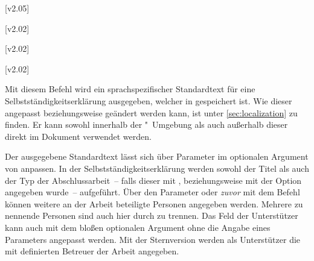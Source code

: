 \begin{DeclareEntity*}{}
\begin{DeclareEntity*}{}
\begin{DeclareEntity*}{}
\begin{Declaration}
  {}
\begin{Declaration}
  {}
  [v2.05]
\begin{Declaration}
  {}
\begin{Declaration}
  {}
\begin{Declaration}
  {}
\begin{Declaration}
  {}
\begin{Declaration}
  {}
  [v2.02]
\begin{Declaration}
  {}
  [v2.02]
\begin{Declaration}
  {}
  [v2.02]
\begin{Declaration}
  {}
Mit diesem Befehl wird ein sprachspezifischer Standardtext für eine 
Selbstständigkeitserklärung ausgegeben, welcher in  
gespeichert ist. Wie dieser angepasst beziehungsweise geändert werden kann, ist 
unter \autoref{sec:localization} zu finden. Er kann sowohl innerhalb der 
"~Umgebung als auch außerhalb dieser direkt im 
Dokument verwendet werden. 

Der ausgegebene Standardtext lässt sich über Parameter im optionalen Argument 
von  anpassen. In der Selbstständigkeitserklärung werden 
sowohl der Titel als auch der Typ der Abschlussarbeit~-- falls dieser mit 
,  beziehungsweise 
mit der Option  angegeben wurde~-- aufgeführt. Über den 
Parameter  oder \emph{zuvor} mit dem Befehl 
 können weitere an der Arbeit beteiligte Personen angegeben 
werden. Mehrere zu nennende Personen sind auch hier durch  zu 
trennen. Das Feld der Unterstützer kann auch mit dem bloßen optionalen Argument 
ohne die Angabe eines Parameters angepasst werden. 
%
Mit der Sternversion  werden als Unterstützer die mit 
 definierten Betreuer der Arbeit angegeben.


\end{Declaration}
\end{Declaration}
\end{Declaration}
\end{Declaration}
\end{Declaration}
\end{Declaration}
\end{Declaration}
\end{Declaration}
\end{Declaration}
\end{Declaration}
\end{DeclareEntity*}
\end{DeclareEntity*}
\end{DeclareEntity*}
